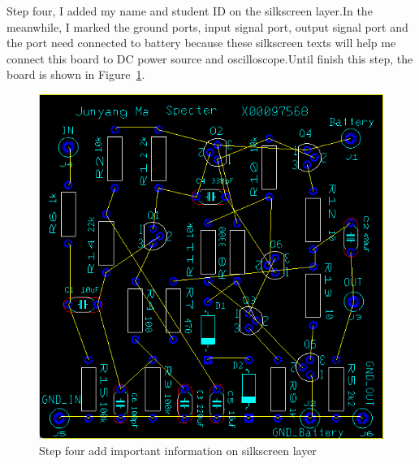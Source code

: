 Step four, I added my name and student ID on the silkscreen layer.In the meanwhile, I marked the ground ports, input signal port, output signal port and the port need connected to battery because these silkscreen texts will help me connect this board to DC power source and oscilloscope.Until finish this step, the board is shown in Figure~\ref{fig:Step four add important information on silkscreen layer}.
 
\begin{figure}[htbp]
	\centering
	\includegraphics[scale=0.7]{"../Photo/Chap6/final PCB not rout"}
	\caption{Step four add important information on silkscreen layer }
	\label{fig:Step four add important information on silkscreen layer}
\end{figure}

